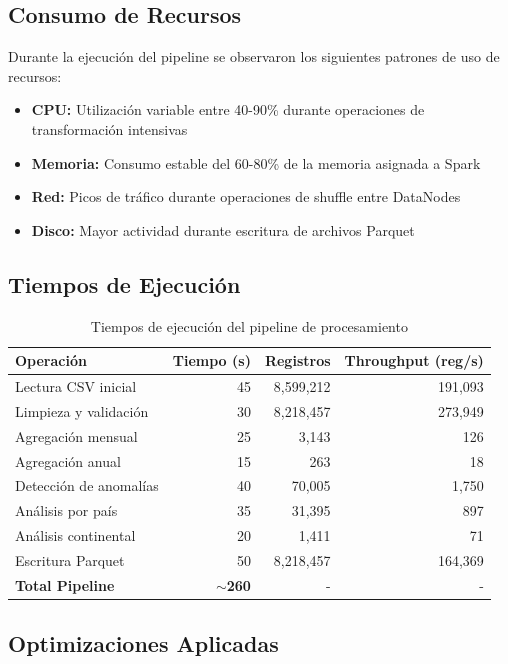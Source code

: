 \documentclass[12pt,a4paper]{scrartcl}
\begin{document}
\subsection{Consumo de Recursos}

Durante la ejecución del pipeline se observaron los siguientes patrones de uso de recursos:

\begin{itemize}
    \item \textbf{CPU:} Utilización variable entre 40-90\% durante operaciones de transformación intensivas
    \item \textbf{Memoria:} Consumo estable del 60-80\% de la memoria asignada a Spark
    \item \textbf{Red:} Picos de tráfico durante operaciones de shuffle entre DataNodes
    \item \textbf{Disco:} Mayor actividad durante escritura de archivos Parquet
\end{itemize}

\subsection{Tiempos de Ejecución}

\begin{table}[h]
\centering
\begin{tabular}{@{}lrrr@{}}
\toprule
\textbf{Operación} & \textbf{Tiempo (s)} & \textbf{Registros} & \textbf{Throughput (reg/s)} \\
\midrule
Lectura CSV inicial & 45 & 8,599,212 & 191,093 \\
Limpieza y validación & 30 & 8,218,457 & 273,949 \\
Agregación mensual & 25 & 3,143 & 126 \\
Agregación anual & 15 & 263 & 18 \\
Detección de anomalías & 40 & 70,005 & 1,750 \\
Análisis por país & 35 & 31,395 & 897 \\
Análisis continental & 20 & 1,411 & 71 \\
Escritura Parquet & 50 & 8,218,457 & 164,369 \\
\midrule
\textbf{Total Pipeline} & \textbf{$\sim$260} & - & - \\
\bottomrule
\end{tabular}
\caption{Tiempos de ejecución del pipeline de procesamiento}
\end{table}

\subsection{Optimizaciones Aplicadas}
\end{document}
